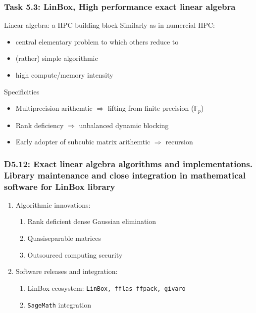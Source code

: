 \documentclass{beamer}
\begin{document}
\begin{frame}
  \frametitle{Task 5.3: LinBox, High performance exact linear algebra}

  \begin{block} {Linear algebra: a HPC building block}
    Similarly as in numercial HPC:
    \begin{itemize}
    \item central elementary problem to which others reduce to
    \item (rather) simple algorithmic
    \item high compute/memory intensity
    \end{itemize}
  \end{block}
    \begin{block}{Specificities}
      \begin{itemize}
      \item Multiprecision arithemtic $\Rightarrow$ lifting from finite  precision ($\mathbb{F}_p$)
      \item Rank deficiency $\Rightarrow$ unbalanced dynamic blocking
      \item Early adopter of subcubic matrix arithemtic $\Rightarrow$ recursion
      \end{itemize}
    \end{block}
      
    \end{frame}
\begin{frame}
  \frametitle{D5.12: Exact linear algebra algorithms and implementations. Library maintenance and close integration in mathematical software for LinBox library}

  \begin{enumerate}
  \item Algorithmic innovations:
    \begin{enumerate}
    \item Rank deficient dense Gaussian elimination
    \item Quasiseparable matrices
    \item Outsourced computing security
    \end{enumerate}
  \item Software releases and integration:
    \begin{enumerate}
    \item LinBox ecosystem: \texttt{LinBox, fflas-ffpack, givaro}
    \item \texttt{SageMath} integration
    \end{enumerate}
  \end{enumerate}
\end{frame}
\end{document}

